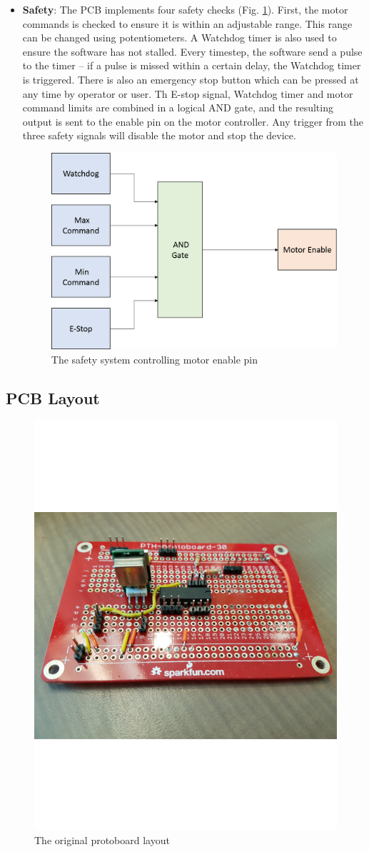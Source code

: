 \documentclass[12pt]{report}
\begin{document}
\begin{itemize}
	\item \textbf{Safety}: The PCB implements four safety checks (Fig. \ref{fig:safety}). First, the motor commands is checked to ensure it is within an adjustable range. This range can be changed using potentiometers. A Watchdog timer is also used to ensure the software has not stalled. Every timestep, the software send a pulse to the timer -- if a pulse is missed within a certain delay, the Watchdog timer is triggered. There is also an emergency stop button which can be pressed at any time by operator or user. Th E-stop signal, Watchdog timer and motor command limits are combined in a logical AND gate, and the resulting output is sent to the enable pin on the motor controller. Any trigger from the three safety signals will disable the motor and stop the device.

	\begin{figure}[h] 
		\centering
		\includegraphics[width=0.6\linewidth]{electronics_safety}
		\caption{The safety system controlling motor enable pin}
		\label{fig:safety}
	\end{figure}	
	 
	\end{itemize}

		
		\subsection{PCB Layout}
		
	\begin{figure}[h] 
		\centering
		\includegraphics[width=0.6\linewidth]{protoboard}
		\caption{The original protoboard layout}
		\label{fig:protoboard}
	\end{figure}		
		
\end{document}
